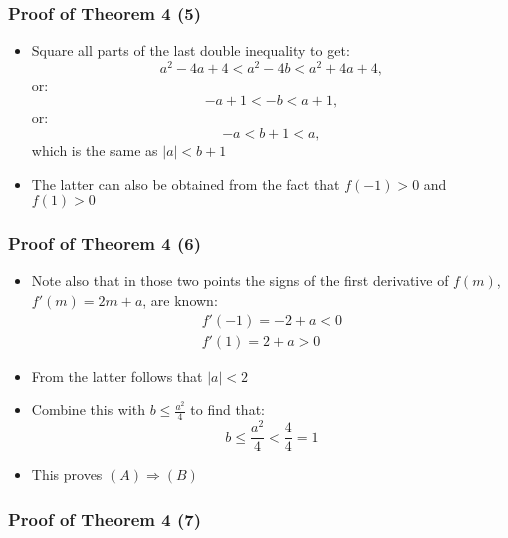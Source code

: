 \documentclass[10pt,usenames,dvipsnames]{beamer}
\theoremstyle{definition}
\begin{document}
\begin{frame}[fragile]
\frametitle{Proof of Theorem 4 (5)}
\begin{itemize}
	\item Square all parts of the last double inequality to get:
	\[
		a^{2} - 4a + 4 < a^{2} - 4b < a^{2} + 4a + 4, 
	\]
	or:
	\[
		- a + 1 < - b < a + 1,
	\]
	or:
	\[
		- a < b + 1 < a,
	\]
	which is the same as $|a| < b + 1$
	\item The latter can also be obtained from the fact that $f(-1) > 0$ and $f(1) > 0$
	
\end{itemize}
\end{frame}

\begin{frame}[fragile]
\frametitle{Proof of Theorem 4 (6)}
\begin{itemize}
	\item Note also that in those two points the signs of the first derivative of $f(m)$, $f'(m) = 2m + a$, are known:
	\[
		\begin{array}{lcl}
			f'(-1) = -2 + a < 0\\
			f'(1) = 2 + a > 0
		\end{array}
	\]
	\item From the latter follows that $|a| < 2$
	\item Combine this with $\displaystyle b \leq \frac{a^{2}}{4}$ to find that:
	\[
		b \leq \frac{a^{2}}{4} < \frac{4}{4} = 1
	\]
	\item This proves $(A) \Rightarrow (B)$
\end{itemize}
\end{frame}

\begin{frame}[fragile]
\frametitle{Proof of Theorem 4 (7)}
\begin{center}
\end{center} 
\end{frame}
\end{document}
